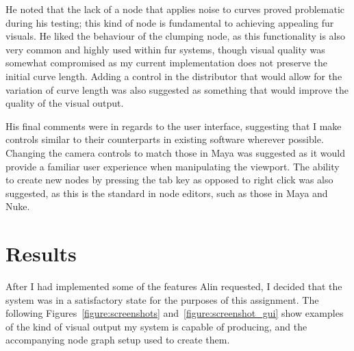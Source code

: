 \documentclass[]{acmsiggraph}
\begin{document}
He noted that the lack of a node that applies noise to curves proved problematic during his testing; this kind of node is fundamental to achieving appealing fur visuals. He liked the behaviour of the clumping node, as this functionality is also very common and highly used within fur systems, though visual quality was somewhat compromised as my current implementation does not preserve the initial curve length. Adding a control in the distributor that would allow for the variation of curve length was also suggested as something that would improve the quality of the visual output.

His final comments were in regards to the user interface, suggesting that I make controls similar to their counterparts in existing software wherever possible. Changing the camera controls to match those in Maya was suggested as it would provide a familiar user experience when manipulating the viewport. The ability to create new nodes by pressing the tab key as opposed to right click was also suggested, as this is the standard in node editors, such as those in Maya and Nuke.

\section{Results} \label{sec:results}

After I had implemented some of the features Alin requested, I decided that the system was in a satisfactory state for the purposes of this assignment. The following Figures~\ref{figure:screenshots} and~\ref{figure:screenshot_gui} show examples of the kind of visual output my system is capable of producing, and the accompanying node graph setup used to create them.
\end{document}
